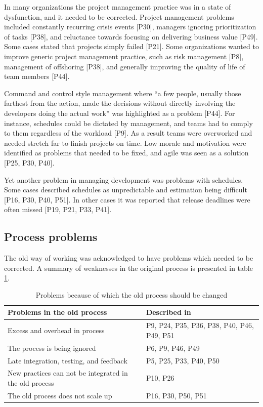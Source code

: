 In many organizations the project management practice was in a state of
dysfunction, and it needed to be corrected. Project management problems included
constantly recurring crisis events [P30], managers ignoring prioritization of
tasks [P38], and reluctance towards focusing on delivering business value [P49].
Some cases stated that projects simply failed [P21]. Some organizations wanted
to improve generic project management practice, such as risk management [P8],
management of offshoring [P38], and generally improving the quality of life of
team members [P44].

Command and control style management where ``a few people, usually those
farthest from the action, made the decisions without directly involving the
developers doing the actual work'' was highlighted as a problem [P44]. For
instance, schedules could be dictated by management, and teams had to comply to
them regardless of the workload [P9]. As a result teams were overworked and
needed stretch far to finish projects on time. Low morale and motivation were
identified as problems that needed to be fixed, and agile was seen as a solution
[P25, P30, P40].

Yet another problem in managing development was problems with schedules.
Some cases described schedules as unpredictable and estimation being difficult
[P16, P30, P40, P51]. In other cases it was reported that release deadlines were
often missed [P19, P21, P33, P41].

\subsection{Process problems}

The old way of working was acknowledged to have problems which needed to be
corrected. A summary of weaknesses in the original process is presented in table
\ref{table:reasonstochange_process}.

\begin{table}
    \centering
    \begin{tabular}{ >{\raggedright\arraybackslash}p{}
                     >{\raggedright\arraybackslash}p{} }
        \toprule
        Problems in the old process           &  Described in  \\
        \midrule
        Excess and overhead in process     &  P9, P24, P35, P36, P38, P40, P46, P49, P51  \\
        The process is being ignored       &  P6, P9, P46, P49  \\
        Late integration, testing, and feedback  &  P5, P25, P33, P40, P50  \\
        New practices can not be integrated in the old process  &  P10, P26  \\
        The old process does not scale up  &  P16, P30, P50, P51  \\
        \bottomrule
    \end{tabular}
    \caption{Problems because of which the old process should be changed}
    \label{table:reasonstochange_process}
\end{table}

